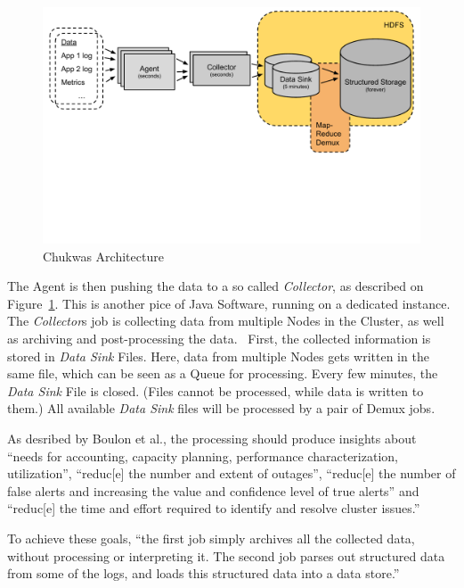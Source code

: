 \begin{figure}[hbt]
  \centering
  \includegraphics[width=\linewidth,clip=true,trim=0 6cm 0 0]{images/ChukwaArchitecture}
  \caption{Chukwas Architecture~\cite{Rabkin2008}}
  \label{fig:ChukwaArchitecture}
\end{figure}

The Agent is then pushing the data to a so called \textit{Collector}, as described on Figure~\ref{fig:ChukwaArchitecture}.
This is another pice of Java Software, running on a dedicated \chuk instance. 
The \textit{Collector}s job is collecting data from multiple Nodes in the Cluster, as well as archiving and post-processing the data.~\cite{Jose2014}
First, the collected information is stored in \textit{Data Sink} Files. 
Here, data from multiple Nodes gets written in the same file, which can be seen as a Queue for processing.
Every few minutes, the \textit{Data Sink} File is closed. (Files cannot be processed, while data is written to them.)
All available \textit{Data Sink} files will be processed by a pair of Demux \mr jobs.~\cite{Boulona} 


As desribed by Boulon et al., the \mr processing should produce insights about ``needs for accounting, capacity planning, performance characterization, utilization'', ``reduc[e] the number and extent of outages'', ``reduc[e] the number of false alerts and increasing the value and confidence level of true alerts'' and ``reduc[e] the time and effort required to identify and resolve cluster issues.''\cite{Boulonb}

To achieve these goals, ``the first job simply archives all the collected data, without processing or interpreting it. The second job parses out structured data from some of the logs, and loads this structured data into a data store.''~\cite{Boulona} 

